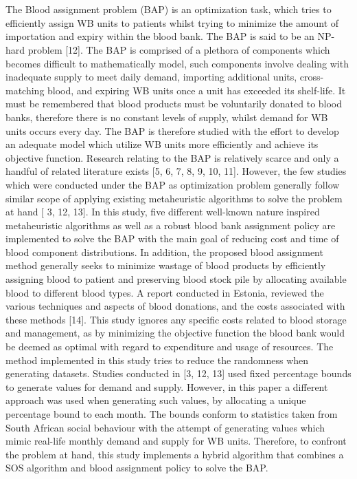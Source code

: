\documentclass{article}
\begin{document}
\\
\\
The Blood assignment problem (BAP) is an optimization task, which tries to efficiently assign WB units to patients whilst trying to minimize the amount of importation and expiry within the blood bank. The BAP is said to be an NP-hard problem [12]. The BAP is comprised of a plethora of components which becomes difficult to mathematically model, such components involve dealing with inadequate supply to meet daily demand, importing additional units, cross-matching blood, and expiring WB units once a unit has exceeded its shelf-life. It must be remembered that blood products must be voluntarily donated to blood banks, therefore there is no constant levels of supply, whilst demand for WB units occurs every day. The BAP is therefore studied with the effort to develop an adequate model which utilize WB units more efficiently and achieve its objective function.
Research relating to the BAP is relatively scarce and only a handful of related literature exists [5, 6, 7, 8, 9, 10, 11]. However, the few studies which were conducted under the BAP as optimization problem generally follow similar scope of applying existing metaheuristic algorithms to solve the problem at hand [ 3, 12, 13]. In this study, five different well-known nature inspired metaheuristic algorithms as well as a robust blood bank assignment policy are implemented to solve the BAP with the main goal of reducing cost and time of blood component distributions. In addition, the proposed blood assignment method generally seeks to minimize wastage of blood products by efficiently assigning blood to patient and preserving blood stock pile by allocating available blood to different blood types. A report conducted in Estonia, reviewed the various techniques and aspects of blood donations, and the costs associated with these methods [14]. This study ignores any specific costs related to blood storage and management, as by minimizing the objective function the blood bank would be deemed as optimal with regard to expenditure and usage of resources.
The method implemented in this study tries to reduce the randomness when generating datasets. Studies conducted in [3, 12, 13] used fixed percentage bounds to generate values for demand and supply. However, in this paper a different approach was used when generating such values, by allocating a unique percentage bound to each month. The bounds conform to statistics taken from South African social behaviour with the attempt of generating values which mimic real-life monthly demand and supply for WB units. Therefore, to confront the problem at hand, this study implements a hybrid algorithm that combines a SOS algorithm and blood assignment policy to solve the BAP.
\end{document}
